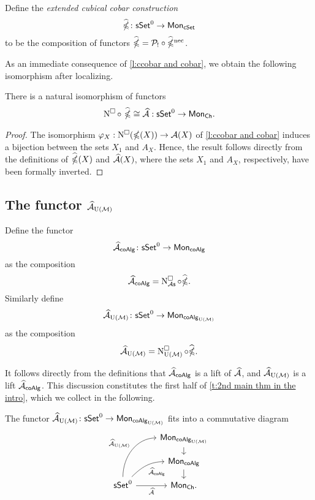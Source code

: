 Define the \textit{extended cubical cobar construction}
\begin{equation*}
\widehat{\ccobar} \colon \sSet^0 \to \Mon_{\cSet}
\end{equation*}
to be the composition of functors $\widehat{\ccobar} = \mathcal{P}_{!} \circ \ncobarE$. 

As an immediate consequence of \cref{l:ccobar and cobar}, we obtain the following isomorphism after localizing. 

\begin{corollary}
	There is a natural isomorphism of functors
	$$\cchains \circ\ \widehat{\ccobar} \cong \Ahat :\sSet^0 \to \Mon_{\Ch}.$$
\end{corollary}
\begin{proof}
The isomorphism $\varphi_X: \cchains(\ccobar(X))\to \A(X)$
of \cref{l:ccobar and cobar} induces a bijection between the sets
$X_1$ and $A_X$.
Hence, the result follows directly from the definitions of  $\ccobarE(X)$ and $\Ahat(X)$, where the sets $X_1$ and $A_X$, respectively, have been formally inverted.
\end{proof}

\subsection{The functor $\Ahat_{\UM}$} \label{s:ahatum}

Define the functor
$$\Ahat_{\coAlg} \colon \sSet^0 \to \Mon_{\coAlg}$$
as the composition
$$\Ahat_{\coAlg} = \cchainsAS \circ \widehat{\ccobar}.$$
Similarly define
$$\Ahat_{\UM} \colon \sSet^0 \to \Mon_{\coAlg_{\UM}}$$
as the composition
$$\Ahat_{\UM} = \cchainsUM \circ \widehat{\ccobar}.$$

It follows directly from the definitions that $\Ahat_{\coAlg}$ is a lift of $\Ahat$, and $\Ahat_{\UM}$ is a lift $\Ahat_{\coAlg}$. This discussion constitutes the first half of \cref{t:2nd main thm in the intro}, which we collect in the following.
\begin{lemma}

The functor $\Ahat_\UM \colon \sSet^0 \to \Mon_{\coAlg_\UM}$ fits into a commutative diagram
	\begin{equation*}
	\begin{tikzcd}[row sep=small]
	& \Mon_{\coAlg_\UM} \arrow[d] \\
	& \Mon_{\coAlg} \arrow[d] \\
	\sSet^0
	\arrow[r, "\Ahat"', ]
	\arrow[ru, "\Ahat_{\coAlg}"', out=45, in=180] 
	\arrow[ruu, "\Ahat_\UM", out=90, in=180]
	& \Mon_{\Ch}.
	\end{tikzcd}
	\end{equation*}
\end{lemma}

